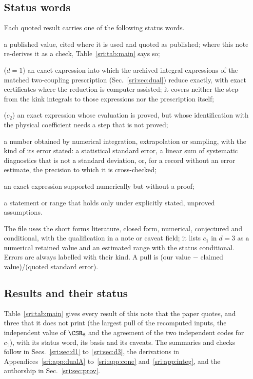 \subsection{Status words}\label{sri:sec:words}
Each quoted result carries one of the following status words.
\begin{description}[leftmargin=1.5em]
\item[literature] a published value, cited where it is used and quoted as published; where this note re-derives it
 as a check, Table~\ref{sri:tab:main} says so;
\item[proved closed form within the prescription] ($d=1$) an exact expression into which the archived integral
 expressions of the matched two-coupling prescription (Sec.~\ref{sri:sec:dual}) reduce exactly, with exact certificates
 where the reduction is computer-assisted; it covers neither the step from the kink integrals to those expressions nor
 the prescription itself;
\item[closed form conditional on one unproved step] ($c_2$) an exact expression whose evaluation is proved, but whose
 identification with the physical coefficient needs a step that is not proved;
\item[numerical] a number obtained by numerical integration, extrapolation or sampling, with the kind of its error
 stated: a statistical standard error, a linear sum of systematic diagnostics that is not a standard deviation, or,
 for a record without an error estimate, the precision to which it is cross-checked;
\item[conjectured] an exact expression supported numerically but without a proof;
\item[conditional] a statement or range that holds only under explicitly stated, unproved assumptions.
\end{description}
The file  uses the short forms literature, closed form, numerical, conjectured and
conditional, with the qualification in a note or caveat field; it lists $c_1$ in $d=3$ as a numerical retained value
and an estimated range with the status conditional. Errors are always labelled with their kind. A pull is (our value $-$ claimed
value)/(quoted standard error).

\subsection{Results and their status}
Table~\ref{sri:tab:main} gives every result of this note that the paper quotes, and three that it does not print (the
largest pull of the recomputed inputs, the independent value of $\CSR_8$ and the agreement of the two independent
codes for $c_1$), with its status word, its basis and its caveats. The summaries and checks follow in
Secs.~\ref{sri:sec:d1} to~\ref{sri:sec:d3}, the derivations in Appendices~\ref{sri:app:dualA} to~\ref{sri:app:cone}
and~\ref{sri:app:integ}, and the authorship in Sec.~\ref{sri:sec:prov}.

